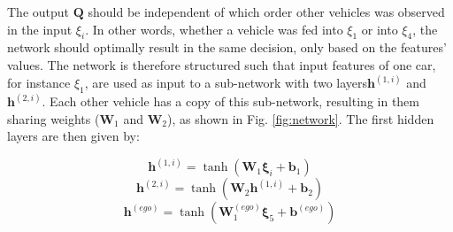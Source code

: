 
The output $\bm{Q}$ should be independent of which order other vehicles was observed in the input $\xi_i$. In other words, whether a vehicle was fed into $\xi_1$ or into $\xi_4$, the network should optimally result in the same decision, only based on the features' values. 
The network is therefore structured such that input features of one car, for instance $\xi_1$, are used as input to a sub-network with two layers$\bm{h}^{(1, i)}$ and $\bm{h}^{(2, i)}$. Each other vehicle has a copy of this sub-network, resulting in them sharing weights ($\bm{W}_1$ and $\bm{W}_2$), as shown in Fig. \ref{fig:network}. The first hidden layers are then given by:

\begin{equation}
\bm{h}^{(1, i)} = \tanh\left(\bm{W}_1 \bm\xi_i + \bm{b}_1\right)
\end{equation}
\begin{equation}
\bm{h}^{(2, i)} = \tanh\left(\bm{W}_2 \bm{h}^{(1, i)} + \bm{b}_2\right)
\end{equation}
\begin{equation}
\bm h^{(ego)}   = \tanh\left(\bm{W}^{(ego)}_{1}  \bm\xi_5 + \bm{b}^{(ego)}\right)
\end{equation}

